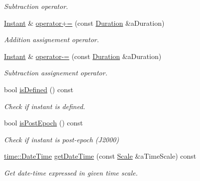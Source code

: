 \begin{DoxyCompactItemize}
\begin{DoxyCompactList}\small\item\em Subtraction operator. \end{DoxyCompactList}\item 
\hyperlink{classlibrary_1_1physics_1_1time_1_1_instant}{Instant} \& \hyperlink{classlibrary_1_1physics_1_1time_1_1_instant_a91febb93e31d68b4fe02910f0dbfa365}{operator+=} (const \hyperlink{classlibrary_1_1physics_1_1time_1_1_duration}{Duration} \&a\+Duration)
\begin{DoxyCompactList}\small\item\em Addition assignement operator. \end{DoxyCompactList}\item 
\hyperlink{classlibrary_1_1physics_1_1time_1_1_instant}{Instant} \& \hyperlink{classlibrary_1_1physics_1_1time_1_1_instant_a629531fc4507a3ef0375f88696fed34e}{operator-\/=} (const \hyperlink{classlibrary_1_1physics_1_1time_1_1_duration}{Duration} \&a\+Duration)
\begin{DoxyCompactList}\small\item\em Subtraction assignement operator. \end{DoxyCompactList}\item 
bool \hyperlink{classlibrary_1_1physics_1_1time_1_1_instant_aaef81e773a2d3059612b0d99dc7cf661}{is\+Defined} () const
\begin{DoxyCompactList}\small\item\em Check if instant is defined. \end{DoxyCompactList}\item 
bool \hyperlink{classlibrary_1_1physics_1_1time_1_1_instant_a649a2505c26b68b17ed7a80429b599ee}{is\+Post\+Epoch} () const
\begin{DoxyCompactList}\small\item\em Check if instant is post-\/epoch (J2000) \end{DoxyCompactList}\item 
\hyperlink{classlibrary_1_1physics_1_1time_1_1_date_time}{time\+::\+Date\+Time} \hyperlink{classlibrary_1_1physics_1_1time_1_1_instant_ae40dbe983c197c961c0cf5aceefa352c}{get\+Date\+Time} (const \hyperlink{namespacelibrary_1_1physics_1_1time_a09d2bc9fbc7b0b5f92e1419bd655e6bb}{Scale} \&a\+Time\+Scale) const
\begin{DoxyCompactList}\small\item\em Get date-\/time expressed in given time scale. \end{DoxyCompactList}\item 

\end{DoxyCompactItemize}
